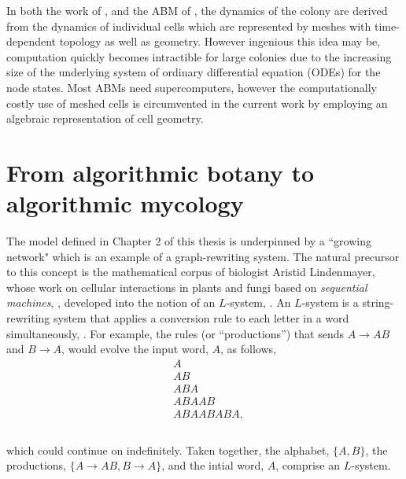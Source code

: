 In both the work of \cite{van2020quantitative}, and the ABM of 
\cite{brown2021rigid}, the dynamics of the colony 
are derived from the dynamics of individual cells which are represented
by meshes with time-dependent topology as well as geometry. However ingenious this idea may be, 
computation quickly becomes intractible for large colonies
due to the increasing size of the underlying system of ordinary differential equation (ODEs)
for the node states. Most ABMs need supercomputers, however
the computationally costly use of meshed cells is circumvented in the current work by employing 
an algebraic representation of cell geometry.
\\

\section{From algorithmic botany to algorithmic mycology}

The model defined in Chapter 2 of this thesis is underpinned by a ``growing network" which is an example 
of a graph-rewriting system. The natural precursor 
to this concept is the mathematical corpus of biologist Aristid Lindenmayer, whose work 
on cellular interactions in plants and fungi based on \textit{sequential machines}, 
\cite{lindenmayer1968mathematical}, developed 
into the notion of an $L$-system, \cite{prusinkiewicz2012algorithmic}. An $L$-system
is a string-rewriting system that applies a conversion rule to each letter in a word 
simultaneously, \cite{prusinkiewicz2012algorithmic}. For example,
the rules (or ``productions'') that sends $A \rightarrow AB$ and $B \rightarrow A$,
would evolve the input word, $A$, as follows,
\begin{equation*}
\begin{split}
&A \\
&AB \\
&ABA \\
&ABAAB \\
&ABAABABA, \\
\end{split}
\end{equation*}
\\
which could continue on indefinitely. Taken together,
the alphabet, $\{A, B\}$, the productions, $\{ A \rightarrow AB, B \rightarrow A \}$, and 
the intial word, $A$, comprise an $L$-system. 
\\

